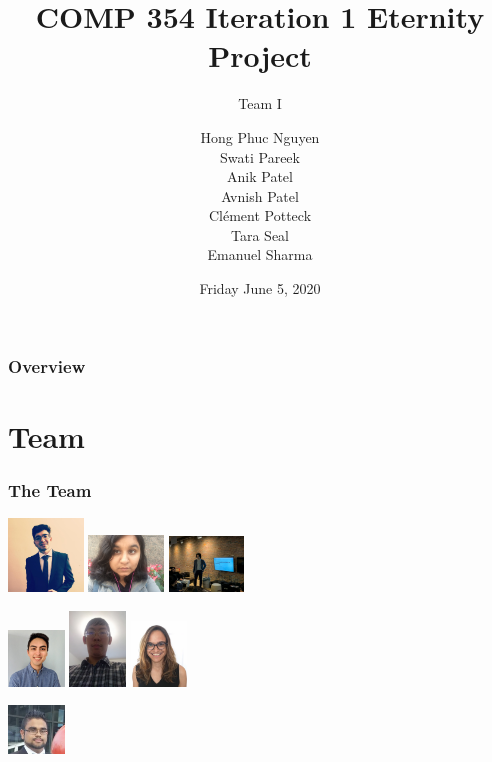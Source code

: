 \documentclass{beamer}
\title{COMP 354 Iteration 1 Eternity Project}
\subtitle {Team I}
\author
{
Hong Phuc Nguyen \\ Swati Pareek \\Anik Patel\\Avnish Patel 
\\Clément Potteck \\ Tara Seal \\Emanuel Sharma
}
\institute{Concordia University}
\date{Friday June 5, 2020}
\begin{document}
\frame{\titlepage}

\begin{frame}
\frametitle{Overview}
\tableofcontents
\end{frame}

\section{Team}




\begin{frame}
\frametitle{The Team}
  \hfil\hfil\includegraphics[width=2cm]{Avnish}
  \hfil\hfil
    \includegraphics[width=2cm]{Swati}
    \hfil\hfil
    \includegraphics[width=2cm]{Emanuel}
    \newline
  \null\hfil\hfil{}
    \hfil\hfil{}  
     \hfil\hfil{} 
    
    \bigskip
    
  \hfil\hfil\includegraphics[width=1.5cm]{Clement}
  \hfil\hfil
    \includegraphics[width=1.5cm]{Nguyen}
    \hfil\hfil
    \includegraphics[width=1.5cm]{Tara}
    \newline
  \null\hfil\hfil{}
    \hfil\hfil{}  
     \hfil\hfil{} 
     \bigskip
      \bigskip
      
           \hfil\hfil\includegraphics[width=1.5cm]{Anik}\newline
  \null\hfil\hfil{}\newline
\end{frame}
\end{document}

